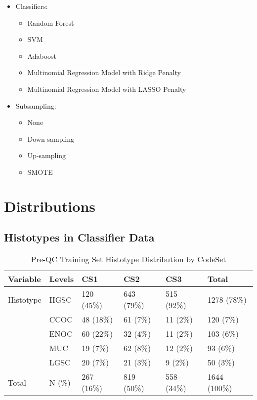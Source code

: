 \documentclass[
]{report}
\providecommand{\tightlist}{%
  \setlength{\itemsep}{0pt}\setlength{\parskip}{0pt}}
\begin{document}
\begin{itemize}
\item
  Classifiers:

  \begin{itemize}
  \tightlist
  \item
    Random Forest
  \item
    SVM
  \item
    Adaboost
  \item
    Multinomial Regression Model with Ridge Penalty
  \item
    Multinomial Regression Model with LASSO Penalty
  \end{itemize}
\item
  Subsampling:

  \begin{itemize}
  \tightlist
  \item
    None
  \item
    Down-sampling
  \item
    Up-sampling
  \item
    SMOTE
  \end{itemize}
\end{itemize}

\hypertarget{distributions}{%
\chapter{Distributions}\label{distributions}}

\hypertarget{histotypes-in-classifier-data}{%
\section{Histotypes in Classifier Data}\label{histotypes-in-classifier-data}}

\begin{table}

\caption{\label{tab:preqc-hist-codeset}Pre-QC Training Set Histotype Distribution by CodeSet}
\centering
\begin{tabular}[t]{l|l|l|l|l|l}
\hline
Variable & Levels & CS1 & CS2 & CS3 & Total\\
\hline
Histotype & HGSC & 120 (45\%) & 643 (79\%) & 515 (92\%) & 1278 (78\%)\\
\hline
 & CCOC & 48 (18\%) & 61 (7\%) & 11 (2\%) & 120 (7\%)\\
\hline
 & ENOC & 60 (22\%) & 32 (4\%) & 11 (2\%) & 103 (6\%)\\
\hline
 & MUC & 19 (7\%) & 62 (8\%) & 12 (2\%) & 93 (6\%)\\
\hline
 & LGSC & 20 (7\%) & 21 (3\%) & 9 (2\%) & 50 (3\%)\\
\hline
Total & N (\%) & 267 (16\%) & 819 (50\%) & 558 (34\%) & 1644 (100\%)\\
\hline
\end{tabular}
\end{table}
\end{document}
